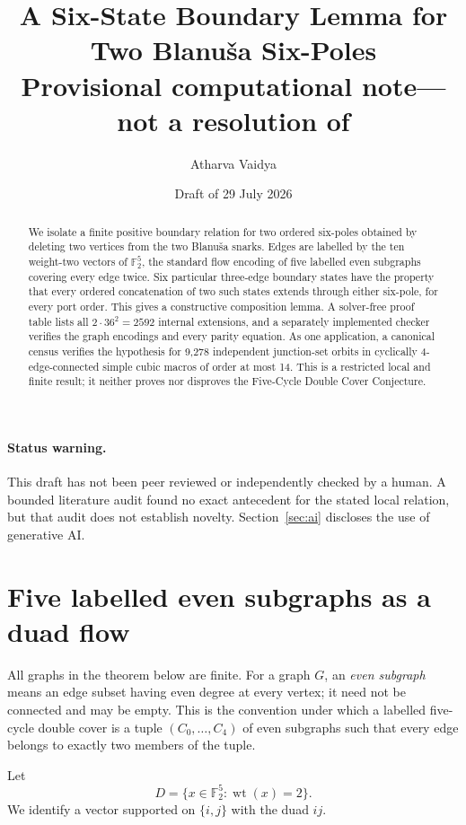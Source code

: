 \documentclass[11pt]{article}
\title{A Six-State Boundary Lemma for Two Blanu\v{s}a Six-Poles\\
\large Provisional computational note---not a resolution of \FiveCDC}
\author{Atharva Vaidya}
\date{Draft of 29 July 2026}
\theoremstyle{definition}
\newcommand{\F}{\mathbb F}
\newcommand{\wt}{\operatorname{wt}}
\begin{document}
\maketitle

\begin{abstract}
We isolate a finite positive boundary relation for two ordered six-poles
obtained by deleting two vertices from the two Blanu\v{s}a snarks.  Edges are
labelled by the ten weight-two vectors of $\F_2^5$, the standard flow encoding
of five labelled even subgraphs covering every edge twice.  Six particular
three-edge boundary states have the property that every ordered concatenation
of two such states extends through either six-pole, for every port order.
This gives a constructive composition lemma.  A solver-free proof table lists
all $2\cdot36^2=2592$ internal extensions, and a separately implemented checker
verifies the graph encodings and every parity equation.  As one application,
a canonical census verifies the hypothesis for 9,278 independent
junction-set orbits in cyclically 4-edge-connected simple cubic macros of
order at most 14.  This is a restricted local and finite result; it neither
proves nor disproves the Five-Cycle Double Cover Conjecture.
\end{abstract}

\paragraph{Status warning.}
This draft has not been peer reviewed or independently checked by a human.
A bounded literature audit found no exact antecedent for the stated local
relation, but that audit does not establish novelty.  Section~\ref{sec:ai}
discloses the use of generative AI.

\section{Five labelled even subgraphs as a duad flow}

All graphs in the theorem below are finite.  For a graph $G$, an
\emph{even subgraph} means an edge subset having even degree at every vertex;
it need not be connected and may be empty.  This is the convention under
which a labelled five-cycle double cover is a tuple
$(C_0,\ldots,C_4)$ of even subgraphs such that every edge belongs to exactly
two members of the tuple.

Let
\[
 D=\{x\in\F_2^5:\wt(x)=2\}.
\]
We identify a vector supported on $\{i,j\}$ with the duad $ij$.
\end{document}

